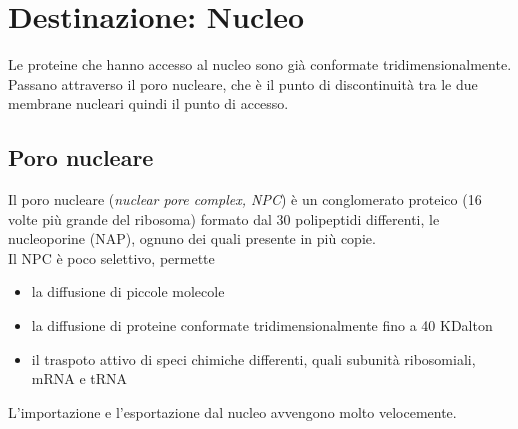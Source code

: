 \section{Destinazione: Nucleo}
    Le proteine che hanno accesso al nucleo sono già conformate tridimensionalmente. Passano attraverso il poro nucleare, che è il punto di discontinuità tra le due membrane nucleari quindi il punto di accesso.
    \subsection{Poro nucleare}
        Il poro nucleare (\textit{nuclear pore complex, NPC}) è un conglomerato proteico (16 volte più grande del ribosoma) formato dal 30 polipeptidi differenti, le nucleoporine (NAP), ognuno dei quali presente in più copie.\\
        Il NPC è poco selettivo, permette
        \begin{itemize}
            \item la diffusione di piccole molecole
            \item la diffusione di proteine conformate tridimensionalmente fino a 40 KDalton
            \item il traspoto attivo di speci chimiche differenti, quali subunità ribosomiali, mRNA e tRNA
        \end{itemize}
        L'importazione e l'esportazione dal nucleo avvengono molto velocemente.
